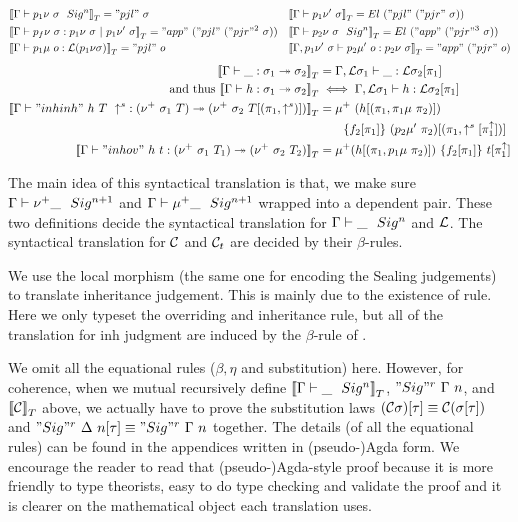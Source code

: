 \begin{align*}
  &{{\llbracket {{ {\Gamma} \vdash {p_1\nu~\sigma} \ \ Sig^{n} }} \rrbracket}_T} = "pjl"~\sigma 
  &&{{\llbracket {{ {\Gamma} \vdash {p_1\nu'~\sigma} }} \rrbracket}_T} = El~("pjl"~("pjr"~\sigma)) \\
  &{{\llbracket {{ {\Gamma} \vdash {p_f\nu~\sigma} : {p_1\nu~\sigma} \ |\ {p_1\nu'~\sigma} }} \rrbracket}_T} = "app"~("pjl"~("pjr"^2~\sigma)) 
  &&{{\llbracket {{ {\Gamma} \vdash {p_2\nu~\sigma} \ \ Sig^{n} }} \rrbracket}_T} = El~("app"~("pjr"^3~\sigma)) \\ 
  &{{\llbracket {{ {\Gamma} \vdash {p_1\mu~o} : {{\mathcal{L}}(p_1\nu\sigma)} }} \rrbracket}_T} = "pjl"~o 
  &&{{\llbracket {{ {\Gamma, p_1\nu'~\sigma} \vdash {p_2\mu'~o} : {p_2\nu~\sigma} }} \rrbracket}_T} = "app"~("pjr"~o)
\end{align*}
\begin{align*}
  {{\llbracket {{ {\Gamma} \vdash {\_} : {\sigma_1} \twoheadrightarrow {\sigma_2}}} \rrbracket}_T} &= { {\Gamma, {\mathcal{L}}\sigma_1} \vdash {\_} : {{\mathcal{L}}\sigma_2[\pi_1]} } \\ \text{ and thus } {{\llbracket {{ {\Gamma} \vdash {h} : {\sigma_1} \twoheadrightarrow {\sigma_2}}} \rrbracket}_T} &\iff  { {\Gamma, {\mathcal{L}}\sigma_1} \vdash {h} : {{\mathcal{L}}\sigma_2[\pi_1]} } \\
  {{\llbracket {{ {\Gamma} \vdash {"inhinh"~h~T~\uparrow^s} : {(\nu^+ \  \sigma_1 \  T)} \twoheadrightarrow {(\nu^+ \  \sigma_2 \  T[(\pi_1, \uparrow^s)])}}} \rrbracket}_T} &= \mu^+~(h[(\pi_1,\pi_1\mu~\pi_2)])\\ &\quad \quad \{f_2[\pi_1]\}~(p_2\mu'~\pi_2)[(\pi_1, \uparrow^s[\pi_1^{\uparrow}])] \\
  {{\llbracket {{ {\Gamma} \vdash {"inhov"~h~t} : {(\nu^+ \  \sigma_1 \  T_1)} \twoheadrightarrow {(\nu^+ \  \sigma_2\  T_2)}}} \rrbracket}_T} &= \mu^+ (h[(\pi_1, p_1\mu~\pi_2)])~\{f_2[\pi_1]\}~t[\pi_1^{\uparrow}]
\end{align*}

The main idea of this syntactical translation is that, we make sure ${ {\Gamma} \vdash {\nu^+ \_ } \ \ Sig^{n+1} }$ and ${ {\Gamma} \vdash {\mu^+ \_} \ \ Sig^{n+1} }$ wrapped into a dependent pair. These two definitions decide the syntactical translation for ${ {\Gamma} \vdash {\_} \ \ Sig^{n} }$ and ${\mathcal{L}}$. The syntactical translation for ${\mathcal{C}}$ and ${\mathcal{C}_t}$ are decided by their $\beta$-rules. 

We use the local morphism (the same one for encoding the Sealing judgements) to translate inheritance judgement. This is mainly due to the existence of  rule. Here we only typeset the overriding and inheritance rule, but all of the translation for inh judgment are induced by the $\beta$-rule of .

We omit all the equational rules ($\beta,\eta$ and substitution) here. However, for coherence, when we mutual recursively define ${{\llbracket {{ {\Gamma} \vdash {\_} \ \ Sig^{n} }} \rrbracket}_T}$, ${{ "Sig"^r~{\Gamma}~{n} }} $, and ${{\llbracket {{\mathcal{C}}} \rrbracket}_T}$ above, we actually have to prove the substitution laws $({\mathcal{C}}\sigma)[\tau]\equiv {\mathcal{C}}(\sigma[\tau])$ and ${ "Sig"^r~{\Delta}~{n} }[\tau] \equiv { "Sig"^r~{\Gamma}~{n} }$ together. The details (of all the equational rules) can be found in the appendices written in (pseudo-)Agda form. We encourage the reader to read that (pseudo-)Agda-style proof because it is more friendly to type theorists, easy to do type checking and validate the proof and it is clearer on the mathematical object each translation uses.



